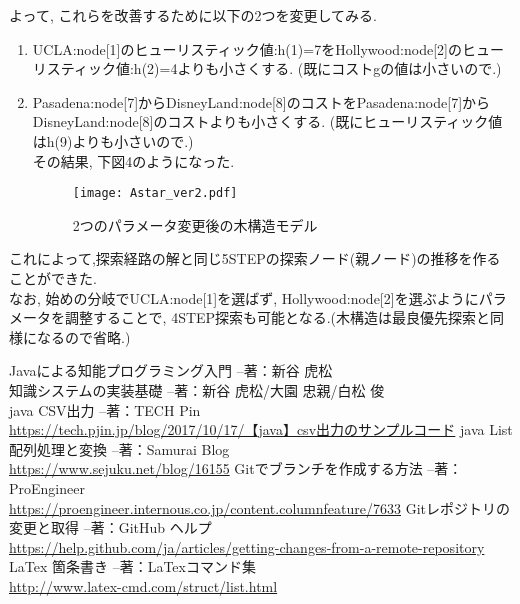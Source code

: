 \documentclass[uplatex,12pt]{jsarticle}
\begin{document}
よって, これらを改善するために以下の2つを変更してみる.
\begin{enumerate}
 \item UCLA:node[1]のヒューリスティック値:h(1)=7をHollywood:node[2]のヒューリスティック値:h(2)=4よりも小さくする. (既にコストgの値は小さいので.)
 \item Pasadena:node[7]からDisneyLand:node[8]のコストをPasadena:node[7]からDisneyLand:node[8]のコストよりも小さくする. (既にヒューリスティック値はh(9)よりも小さいので.)\\
その結果, 下図4のようになった.
\begin{figure}[htbp]
 \begin{center}
  \texttt{[image: Astar\_ver2.pdf]}
 \end{center}
 \caption[]{2つのパラメータ変更後の木構造モデル}\label{fig:fig1.3}
\end{figure}
\end{enumerate}
これによって,探索経路の解と同じ5STEPの探索ノード(親ノード)の推移を作ることができた.\\
なお, 始めの分岐でUCLA:node[1]を選ばず, Hollywood:node[2]を選ぶようにパラメータを調整することで, 4STEP探索も可能となる.(木構造は最良優先探索と同様になるので省略.)\\

\begin{thebibliography}{99}
 Javaによる知能プログラミング入門 --著：新谷 虎松 \\
 知識システムの実装基礎 --著：新谷 虎松/大園 忠親/白松 俊 \\
 java CSV出力 --著：TECH Pin \\
\url{https://tech.pjin.jp/blog/2017/10/17/【java】csv出力のサンプルコード}
 java List配列処理と変換 --著：Samurai Blog \\
\url{https://www.sejuku.net/blog/16155}
 Gitでブランチを作成する方法 --著：ProEngineer \\
\url{https://proengineer.internous.co.jp/content.columnfeature/7633}
 Gitレポジトリの変更と取得 --著：GitHub ヘルプ\\
\url{https://help.github.com/ja/articles/getting-changes-from-a-remote-repository}
 LaTex 箇条書き --著：LaTexコマンド集\\
\url{http://www.latex-cmd.com/struct/list.html}
\end{thebibliography}
\end{document}
